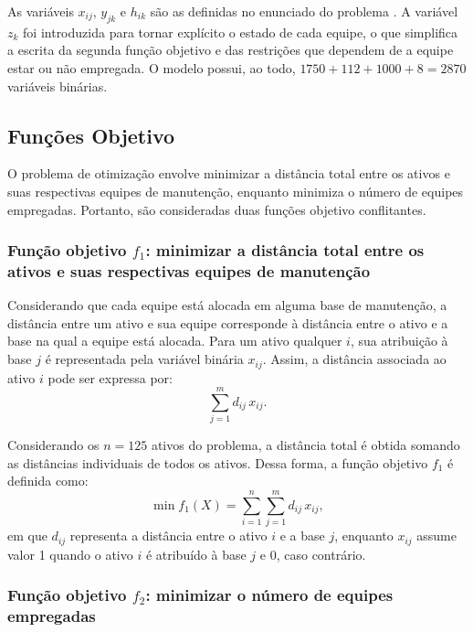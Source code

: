 \documentclass[conference]{IEEEtran}
\begin{document}
As variáveis $x_{ij}$, $y_{jk}$ e $h_{ik}$ são as definidas no enunciado do problema \cite{batista_tc}. A variável $z_k$ foi introduzida para tornar explícito o estado de cada equipe, o que simplifica a escrita da segunda função objetivo e das restrições que dependem de a equipe estar ou não empregada. O modelo possui, ao todo, $1750 + 112 + 1000 + 8 = 2870$ variáveis binárias.

\subsection{Funções Objetivo}

O problema de otimização envolve minimizar a distância total entre os ativos e suas respectivas equipes de manutenção, enquanto minimiza o número de equipes empregadas. Portanto, são consideradas duas funções objetivo conflitantes.

\subsubsection{Função objetivo $f_1$: minimizar a distância total entre os ativos e suas respectivas equipes de manutenção}

Considerando que cada equipe está alocada em alguma base de manutenção, a distância entre um ativo e sua equipe corresponde à distância entre o ativo e a base na qual a equipe está alocada. Para um ativo qualquer $i$, sua atribuição à base $j$ é representada pela variável binária $x_{ij}$. Assim, a distância associada ao ativo $i$ pode ser expressa por:
\begin{equation}
\sum_{j=1}^{m} d_{ij}\,x_{ij}.
\end{equation}

Considerando os $n = 125$ ativos do problema, a distância total é obtida somando as distâncias individuais de todos os ativos. Dessa forma, a função objetivo $f_1$ é definida como:
\begin{equation}
\min f_1(X) = \sum_{i=1}^{n}\sum_{j=1}^{m} d_{ij}\,x_{ij},
\label{eq:f1}
\end{equation}
em que $d_{ij}$ representa a distância entre o ativo $i$ e a base $j$, enquanto $x_{ij}$ assume valor 1 quando o ativo $i$ é atribuído à base $j$ e 0, caso contrário.

\subsubsection{Função objetivo $f_2$: minimizar o número de equipes empregadas}
\end{document}
